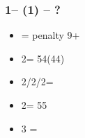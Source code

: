 \documentclass[12pt, a4paper]{article}
\begin{document}
\subsubsection*{1\clubs -- (1\nt) -- ?}
\begin{itemize}
    \item \dbl = penalty 9+
    \item 2\clubs = 54\major (44)
    \item 2\diams/2\hearts/2\spades = \nf
    \item 2\nt = 55\minor
    \item 3 = \inv\ \unbal
\end{itemize}


\end{document}
